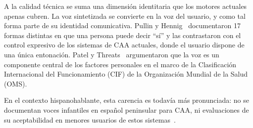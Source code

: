 A la calidad técnica se suma una dimensión identitaria que los motores actuales apenas cubren. La voz sintetizada se convierte en la voz del usuario, y como tal forma parte de su identidad comunicativa. Pullin y Hennig~\cite{pullin2015seventeen} documentaron 17 formas distintas en que una persona puede decir ``sí'' y las contrastaron con el control expresivo de los sistemas de CAA actuales, donde el usuario dispone de una única entonación. Patel y Threats~\cite{patel2016voice} argumentaron que la voz es un componente central de los factores personales en el marco de la Clasificación Internacional del Funcionamiento (CIF) de la Organización Mundial de la Salud (OMS).

En el contexto hispanohablante, esta carencia es todavía más pronunciada: no se documentan voces infantiles en español peninsular para CAA, ni evaluaciones de su aceptabilidad en menores usuarios de estos sistemas~\cite{terblanche2025childvoices}.
